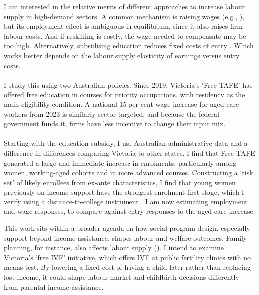  I am interested in the relative merits of different approaches to increase labour supply in high-demand sectors. A common mechanism is raising wages (e.g., \cite{dalbo_finan_rossi2013}), but its employment effect is ambiguous in equilibrium, since it also raises firm labour costs. And if reskilling is costly, the wage needed to compensate may be too high. Alternatively, subsidising education reduces fixed costs of entry \citep{schoonover2026}. Which works better depends on the labour supply elasticity of earnings versus entry costs. \\~\\I study this using two Australian policies. Since 2019, Victoria's `Free TAFE' has offered free education in courses for priority occupations, with residency as the main eligibility condition. A national 15 per cent wage increase for aged care workers from 2023 \citep{fwc_agedcare2022} is similarly sector-targeted, and because the federal government funds it, firms have less incentive to change their input mix. \\~\\Starting with the education subsidy, I use Australian administrative data and a difference-in-differences comparing Victoria to other states. I find that Free TAFE generated a large and immediate increase in enrolments, particularly among women, working-aged cohorts and in more advanced courses. Constructing a `risk set' of likely enrollees from ex-ante characteristics, I find that young women previously on income support have the strongest enrolment first stage, which I verify using a distance-to-college instrument \citep{card1995}. I am now estimating employment and wage responses, to compare against entry responses to the aged care increase.

 This work sits within a broader agenda on how social program design, especially support beyond income assistance, shapes labour and welfare outcomes. Family planning, for instance, also affects labour supply (\cite{gallen2026}). I intend to examine Victoria's `free IVF' initiative, which offers IVF at public fertility clinics with no means test. By lowering a fixed cost of having a child later rather than replacing lost income, it could shape labour market and childbirth decisions differently from parental income assistance.
